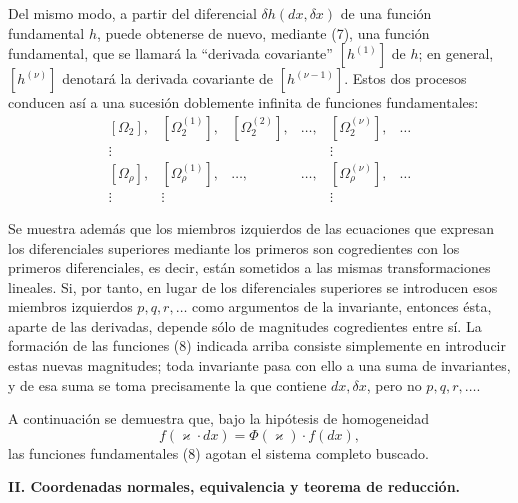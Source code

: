 Del mismo modo, a partir del diferencial \(\delta h(dx,\delta x)\) de una
función fundamental \(h\), puede obtenerse de nuevo, mediante (7), una función
fundamental, que se llamará la ``derivada covariante'' \([h^{(1)}]\) de \(h\);
en general, \([h^{(\nu)}]\) denotará la derivada covariante de
\([h^{(\nu-1)}]\). Estos dos procesos conducen así a una sucesión doblemente
infinita de funciones fundamentales:
\begin{equation}
\begin{array}{cccccc}
[\Omega_2], & [\Omega_2^{(1)}], & [\Omega_2^{(2)}], & \ldots,
& [\Omega_2^{(\nu)}], & \ldots\\
\vdots &&&& \vdots&\\
{}[\Omega_\rho], & [\Omega_\rho^{(1)}], & \ldots, & \ldots,
& [\Omega_\rho^{(\nu)}], & \ldots\\
\vdots & \vdots &&& \vdots&
\end{array}
\tag{8}
\end{equation}

Se muestra además que los miembros izquierdos de las ecuaciones que expresan
los diferenciales superiores mediante los primeros son cogredientes con los
primeros diferenciales, es decir, están sometidos a las mismas transformaciones
lineales. Si, por tanto, en lugar de los diferenciales superiores se introducen
esos miembros izquierdos \(p,q,r,\ldots\) como argumentos de la invariante,
entonces ésta, aparte de las derivadas, depende sólo de magnitudes cogredientes
entre sí. La formación de las funciones (8) indicada arriba consiste simplemente
en introducir estas nuevas magnitudes; toda invariante pasa con ello a una suma
de invariantes, y de esa suma se toma precisamente la que contiene
\(dx,\delta x\), pero no \(p,q,r,\ldots\).

A continuación se demuestra que, bajo la hipótesis de homogeneidad
\[
f(\varkappa\cdot dx)=\Phi(\varkappa)\cdot f(dx),
\]
las funciones fundamentales (8) agotan el sistema completo buscado.

\begin{center}
\textbf{II. Coordenadas normales, equivalencia y teorema de reducción.}
\end{center}

